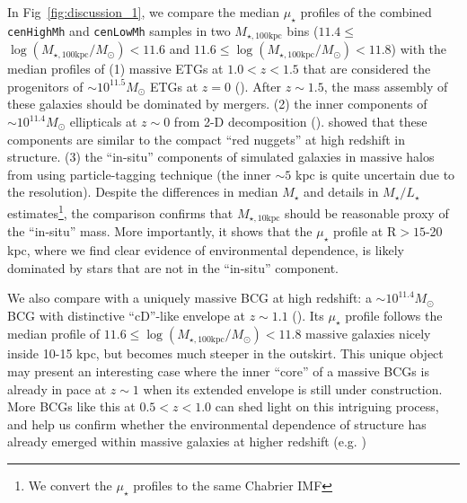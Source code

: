 \documentclass[a4paper,fleqn,usenatbib]{mnras}
\def\rbcg{\texttt{cenHighMh}}
\def\nbcg{\texttt{cenLowMh}}
\def\mstar{{$M_{\star}$}}
\def\minn{{$M_{\star,10\mathrm{kpc}}$}}
\def\mtot{{$M_{\star,100\mathrm{kpc}}$}}
\def\logmtot{{$\log (M_{\star,100\mathrm{kpc}}/M_{\odot})$}}
\def\m2l{{$M_{\star}/L_{\star}$}}
\def\mden{{$\mu_{\star}$}}
\begin{document}
    In Fig~\ref{fig:discussion_1}, we compare the median \mden{} profiles of the 
    combined \rbcg{} and \nbcg{} samples in two \mtot{} bins 
    ($11.4\leq$\logmtot{}$<11.6$ and $11.6\leq$\logmtot{}$<11.8$) with the median 
    profiles of 
    (1) massive ETGs at $1.0 < z < 1.5$ that are considered the progenitors of 
    $\sim 10^{11.5} M_{\odot}$ ETGs at $z=0$ (\citealt{Patel2013}).  
    After $z\sim 1.5$, the mass assembly of these galaxies should be dominated by 
    mergers. 
    (2) the inner components of $\sim 10^{11.4} M_{\odot}$ ellipticals at $z\sim 0$ 
    from 2-D decomposition (\citealt{Huang2013a}). 
    \citet{Huang2013b} showed that these components are similar to the compact 
    ``red nuggets'' at high redshift in structure. 
    (3) the ``in-situ'' components of simulated galaxies in massive halos from 
    \citet{Cooper13} using particle-tagging technique (the inner $\sim 5$ kpc is 
    quite uncertain due to the resolution).  
    Despite the differences in median \mstar{} and details in \m2l{} 
    estimates\footnote{We convert the \mden{} profiles to the same Chabrier IMF}, 
    the comparison confirms that \minn{} should be reasonable proxy of the 
    ``in-situ'' mass.  
    More importantly, it shows that the \mden{} profile at $\mathrm{R} > 15$-20 kpc, 
    where we find clear evidence of environmental dependence, is likely dominated by 
    stars that are not in the ``in-situ'' component.  
    
    
    We also compare with a uniquely massive BCG at high redshift: 
    a $\sim 10^{11.4} M_{\odot}$ BCG with distinctive ``cD''-like envelope at 
    $z\sim 1.1$ (\citealt{Liu2013}).  
    Its \mden{} profile follows the median profile of $11.6\leq$\logmtot{}$<11.8$ 
    massive galaxies nicely inside 10-15 kpc, but becomes much steeper in the outskirt.  
    This unique object may present an interesting case where the inner ``core'' of a 
    massive BCGs is already in pace at $z\sim 1$ when its extended envelope is still
    under construction.
    More BCGs like this at $0.5 < z < 1.0$ can shed light on this intriguing 
    process, and help us confirm whether the environmental dependence of structure 
    has already emerged within massive galaxies at higher redshift 
    (e.g. \citealt{Papovich2012})
    
\end{document}
